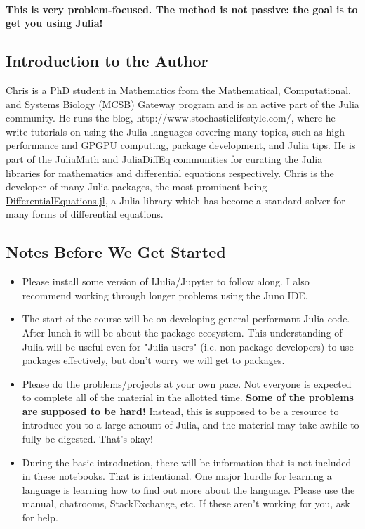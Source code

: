 \documentclass[11pt]{article}
\providecommand{\tightlist}{%
      \setlength{\itemsep}{0pt}\setlength{\parskip}{0pt}}
\begin{document}
\paragraph{This is very problem-focused. The method is not passive: the
goal is to get you using
Julia!}\label{this-is-very-problem-focused.-the-method-is-not-passive-the-goal-is-to-get-you-using-julia}

    \subsection{Introduction to the
Author}\label{introduction-to-the-author}

Chris is a PhD student in Mathematics from the Mathematical,
Computational, and Systems Biology (MCSB) Gateway program and is an
active part of the Julia community. He runs the blog,
http://www.stochasticlifestyle.com/, where he write tutorials on using
the Julia languages covering many topics, such as high-performance and
GPGPU computing, package development, and Julia tips. He is part of the
JuliaMath and JuliaDiffEq communities for curating the Julia libraries
for mathematics and differential equations respectively. Chris is the
developer of many Julia packages, the most prominent being
\href{https://github.com/JuliaDiffEq/DifferentialEquations.jl}{DifferentialEquations.jl},
a Julia library which has become a standard solver for many forms of
differential equations.

    \subsection{Notes Before We Get
Started}\label{notes-before-we-get-started}

\begin{itemize}
\tightlist
\item
  Please install some version of IJulia/Jupyter to follow along. I also
  recommend working through longer problems using the Juno IDE.
\item
  The start of the course will be on developing general performant Julia
  code. After lunch it will be about the package ecosystem. This
  understanding of Julia will be useful even for "Julia users" (i.e. non
  package developers) to use packages effectively, but don't worry we
  will get to packages.
\item
  Please do the problems/projects at your own pace. Not everyone is
  expected to complete all of the material in the allotted time.
  \textbf{Some of the problems are supposed to be hard!} Instead, this
  is supposed to be a resource to introduce you to a large amount of
  Julia, and the material may take awhile to fully be digested. That's
  okay!
\item
  During the basic introduction, there will be information that is not
  included in these notebooks. That is intentional. One major hurdle for
  learning a language is learning how to find out more about the
  language. Please use the manual, chatrooms, StackExchange, etc. If
  these aren't working for you, ask for help.
\end{itemize}
\end{document}
